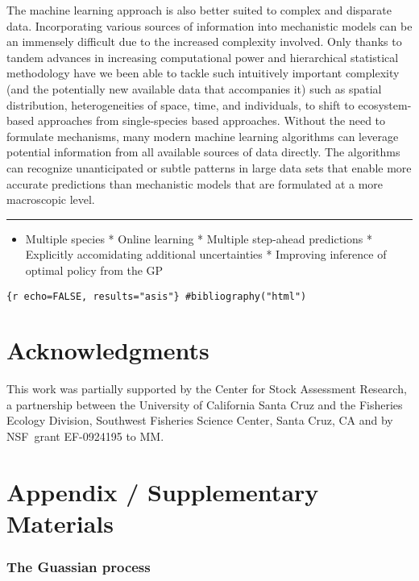 \documentclass[author-year, review]{elsarticle} %
\begin{document}
The machine learning approach is also better suited to complex and
disparate data. Incorporating various sources of information into
mechanistic models can be an immensely difficult due to the increased
complexity involved. Only thanks to tandem advances in increasing
computational power and hierarchical statistical methodology have we
been able to tackle such intuitively important complexity (and the
potentially new available data that accompanies it) such as spatial
distribution, heterogeneities of space, time, and individuals, to shift
to ecosystem-based approaches from single-species based approaches.
Without the need to formulate mechanisms, many modern machine learning
algorithms can leverage potential information from all available sources
of data directly. The algorithms can recognize unanticipated or subtle
patterns in large data sets that enable more accurate predictions than
mechanistic models that are formulated at a more macroscopic level.

\begin{center}\rule{3in}{0.4pt}\end{center}

\begin{itemize}
\itemsep1pt\parskip0pt
\item
  Multiple species * Online learning * Multiple step-ahead predictions *
  Explicitly accomidating additional uncertainties * Improving inference
  of optimal policy from the GP
\end{itemize}

\texttt{\{r echo=FALSE, results="asis"\} \#bibliography("html")}

\section{Acknowledgments}

This work was partially supported by the Center for Stock Assessment
Research, a partnership between the University of California Santa Cruz
and the Fisheries Ecology Division, Southwest Fisheries Science Center,
Santa Cruz, CA and by NSF~grant EF-0924195 to MM.

\section{Appendix / Supplementary Materials}

\subsubsection{The Guassian process}
\end{document}
